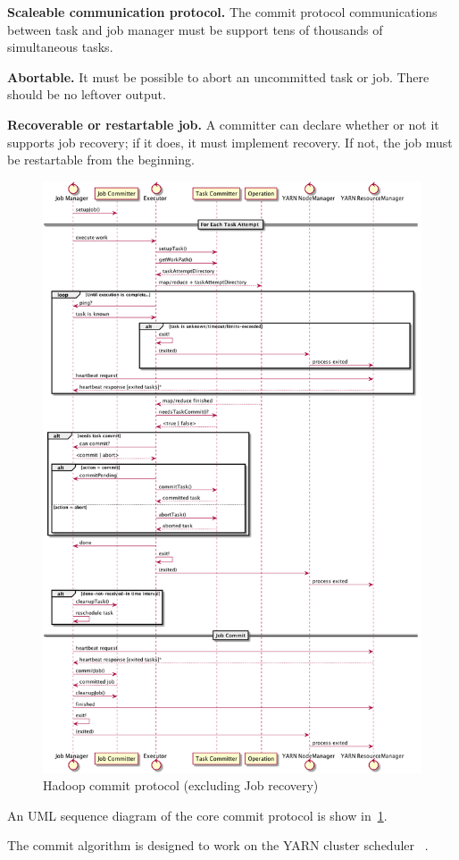 \documentclass[format=acmsmall, screen=true, review=false]{acmart}
\begin{document}
\textbf{Scaleable communication protocol.}
The commit protocol communications between task and job manager
must be support tens of thousands of simultaneous tasks.

\textbf{Abortable.}
It must be possible to abort an uncommitted task or job.
There should be no leftover output.

\textbf{Recoverable or restartable job.}
A committer can declare whether or not it supports job recovery;
if it does, it must implement recovery.
If not, the job must be restartable from the beginning.

\begin{figure}
  \centering
  \includegraphics[width=.8\textwidth]{commit-protocol.png}
  \caption{Hadoop commit protocol (excluding Job recovery)}
  \label{fig:commit-protocol}
\end{figure}

An UML sequence diagram of the core commit protocol is
show in\ \ref{fig:commit-protocol}.

The commit algorithm is designed to work on the YARN cluster scheduler
\ \cite{Vavilapalli2013}.
\end{document}
